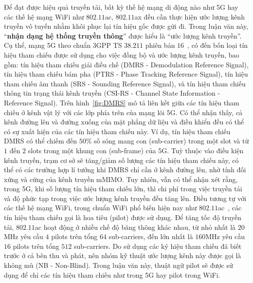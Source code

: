 Để đạt được hiệu quả truyền tải, bất kỳ thế hệ mạng di động nào như 5G hay các thế hệ mạng WiFi như $802.11$ac, $802.11$ax đều cần thực hiện ước lượng kênh truyền vô tuyến nhằm khôi phục lại tín hiệu gốc được gửi đi. Trong luận văn này, ``\textbf{nhận dạng hệ thống truyền thông}'' được hiểu là ``ước lượng kênh truyền''. Cụ thể, mạng 5G theo chuẩn 3GPP TS $38.211$ phiên bản $16$~\cite{r16}, có đến bốn loại tín hiệu tham chiếu được sử dụng cho việc đồng bộ và ước lượng kênh truyền, bao gồm: tín hiệu tham chiếu giải điều chế (DMRS  - Demodulation Reference Signal), tín hiệu tham chiếu bám pha (PTRS - Phase Tracking Reference Signal), tín hiệu tham chiếu âm thanh (SRS - Sounding Reference Signal), và tín hiệu tham chiếu thông tin trạng thái kênh truyền (CSI-RS - Channel State Information - Reference Signal). Trên hình~\ref{fig:DMRS} mô tả liên kết giữa các tín hiệu tham chiếu ở kênh vật lý với các lớp phía trên của mạng lõi 5G. Có thể nhận thấy, cả kênh đường lên và đường xuống của mặt phẳng dữ liệu và điều khiển đều có thể có sự xuất hiện của các tín hiệu tham chiếu này. Ví dụ, tín hiệu tham chiếu DMRS có thể chiếm đến $50$\% số sóng mang con (sub-carrier) trong một slot và từ $1$ đến $2$ slots trong một khung con (sub-frame) của 5G. Tuỳ thuộc vào điều kiện kênh truyền, trạm cơ sở sẽ tăng/giảm số lượng các tín hiệu tham chiếu này, có thể có các trường hợp lí tưởng khi DMRS chỉ cần ở kênh đường lên, nhờ tính đối xứng và cứng của kênh truyền mMIMO. Tuy nhiên, vẫn có thể nhận xét rằng, trong 5G, khi số lượng tín hiệu tham chiếu lớn, thì chi phí trong việc truyền tải và độ phức tạp trong việc ước lượng kênh truyền đều tăng lên. Điều tương tự với các thế hệ mạng WiFi, trong chuẩn WiFi phổ biến hiện nay như $802.11$ac~\cite{80211ac}, các tín hiệu tham chiếu gọi là hoa tiêu (pilot) được sử dụng. Để tăng tốc độ truyền tải, $802.11$ac hoạt động ở nhiều chế độ băng thông khác nhau, từ nhỏ nhất là $20$MHz yêu cầu $4$ pilots trên tổng $64$ sub-carriers, đến lớn nhất là $160$MHz yêu cầu $16$ pilots trên tổng $512$ sub-carriers. Do sử dụng các ký hiệu tham chiếu đã biết trước ở cả bên thu và phát, nên nhóm kỹ thuật ước lượng kênh này được gọi là không mù (NB - Non-Blind). Trong luận văn này, thuật ngữ pilot sẽ được sử dụng để chỉ các tín hiệu tham chiếu như trong 5G hay pilot trong WiFi.


